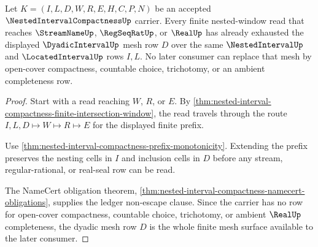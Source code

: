 \begin{theorem}
\label{thm:nested-interval-compactness-dyadic-mesh-exhaustion}
Let $K=(I,L,D,W,R,E,H,C,P,N)$ be an accepted $\NestedIntervalCompactnessUp$ carrier. Every finite nested-window read that reaches $\StreamNameUp$, $\RegSeqRatUp$, or $\RealUp$ has already exhausted the displayed $\DyadicIntervalUp$ mesh row $D$ over the same $\NestedIntervalUp$ and $\LocatedIntervalUp$ rows $I,L$. No later consumer can replace that mesh by open-cover compactness, countable choice, trichotomy, or an ambient completeness row.
\end{theorem}
\begin{proof}
Start with a read reaching $W$, $R$, or $E$. By \autoref{thm:nested-interval-compactness-finite-intersection-window}, the read travels through the route $I,L,D \longmapsto W \longmapsto R \longmapsto E$ for the displayed finite prefix.

Use \autoref{thm:nested-interval-compactness-prefix-monotonicity}. Extending the prefix preserves the nesting cells in $I$ and inclusion cells in $D$ before any stream, regular-rational, or real-seal row can be read.

The NameCert obligation theorem, \autoref{thm:nested-interval-compactness-namecert-obligations}, supplies the ledger non-escape clause. Since the carrier has no row for open-cover compactness, countable choice, trichotomy, or ambient $\RealUp$ completeness, the dyadic mesh row $D$ is the whole finite mesh surface available to the later consumer.
\end{proof}

